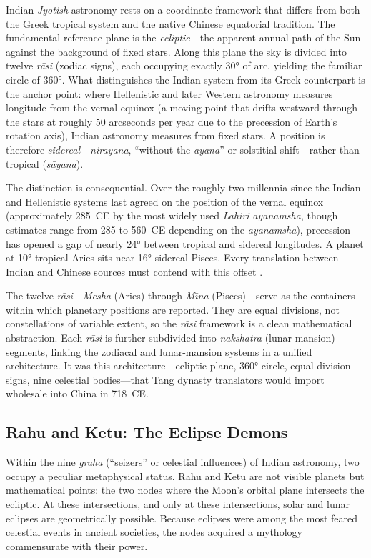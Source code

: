 \documentclass[10pt,a4paper]{article}
\begin{document}
Indian \textit{Jyotish} astronomy rests on a coordinate framework that differs
from both the Greek tropical system and the native Chinese equatorial tradition.
The fundamental reference plane is the \emph{ecliptic}---the apparent annual path
of the Sun against the background of fixed stars.  Along this plane the sky is
divided into twelve \textit{r\=asi} (zodiac signs), each occupying exactly 30° of
arc, yielding the familiar circle of 360°.  What distinguishes the Indian system
from its Greek counterpart is the anchor point: where Hellenistic and later
Western astronomy measures longitude from the vernal equinox (a moving point
that drifts westward through the stars at roughly 50 arcseconds per year due to
the precession of Earth's rotation axis), Indian astronomy measures from fixed
stars.  A position is therefore \emph{sidereal}---\textit{nirayana}, ``without
the \textit{ayana}'' or solstitial shift---rather than tropical
(\textit{s\=ayana}).

The distinction is consequential.  Over the roughly two millennia since the
Indian and Hellenistic systems last agreed on the position of the vernal equinox
(approximately 285~CE by the most widely used \textit{Lahiri} \textit{ayanamsha},
though estimates range from 285 to 560~CE depending on the \textit{ayanamsha}),
precession has opened a gap of nearly 24° between tropical and sidereal
longitudes.  A planet at 10° tropical Aries sits near 16° sidereal Pisces.
Every translation between Indian and Chinese sources must contend with this
offset \cite{pingree1981jyotih}.

The twelve \textit{r\=asi}---\textit{Mesha} (Aries) through \textit{M\={\i}na}
(Pisces)---serve as the containers within which planetary positions are reported.
They are equal divisions, not constellations of variable extent, so the
\textit{r\=asi} framework is a clean mathematical abstraction.  Each
\textit{r\=asi} is further subdivided into \textit{nakshatra} (lunar mansion)
segments, linking the zodiacal and lunar-mansion systems in a unified
architecture.  It was this architecture---ecliptic plane, 360° circle,
equal-division signs, nine celestial bodies---that Tang dynasty translators would
import wholesale into China in 718~CE.

\subsection*{Rahu and Ketu: The Eclipse Demons}

Within the nine \textit{graha} (``seizers'' or celestial influences) of Indian
astronomy, two occupy a peculiar metaphysical status.  Rahu and Ketu are not
visible planets but mathematical points: the two nodes where the Moon's orbital
plane intersects the ecliptic.  At these intersections, and only at these
intersections, solar and lunar eclipses are geometrically possible.  Because
eclipses were among the most feared celestial events in ancient societies, the
nodes acquired a mythology commensurate with their power.
\end{document}
